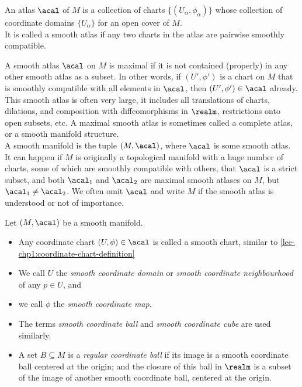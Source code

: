\documentclass[../main-v2-manifolds.tex]{subfiles}
\begin{document}
\begin{definition}\label{lee-chp1:smooth-atlas}
    An atlas $\acal$ of $M$ is a collection of charts $\{(U_\alpha, \phi_\alpha)\}$ whose collection of coordinate domains $\{U_\alpha\}$ for an open cover of $M$.\\ It is called a smooth atlas if any two charts in the atlas are pairwise smoothly compatible.
\end{definition}

\begin{definition}\label{lee-chp1:smooth-manifold}
    A smooth atlas $\acal$ on $M$ is maximal if it is not contained (properly) in any other smooth atlas as a subset. In other words, if $(U',\phi')$ is a chart on $M$ that is smoothly compatible with all elements in $\acal$, then $(U',\phi')\in\acal$ already.\\
    
    This smooth atlas is often very large, it includes all translations of charts, dilations, and composition with diffeomorphisms in $\realm$, restrictions onto open subsets, etc. A maximal smooth atlas is sometimes called a complete atlas, or a smooth manifold structure.\\

    A smooth manifold is the tuple $(M,\acal)$, where $\acal$ is some smooth atlas. It can happen if $M$ is originally a topological manifold with a huge number of charts, some of which are smoothly compatible with others, that $\acal$ is a strict subset, and both $\acal_1$ and $\acal_2$ are maximal smooth atlases on $M$, but $\acal_1\neq\acal_2$. We often omit $\acal$ and write $M$ if the smooth atlas is understood or not of importance.
\end{definition}

\begin{definition}\label{lee-chp1:smooth-coordinate-definitions}
    Let $(M,\acal)$ be a smooth manifold. 
    \begin{itemize}
        \item Any coordinate chart $(U,\phi)\in\acal$ is called a smooth chart, similar to \cref{lee-chp1:coordinate-chart-definition}
        \item We call $U$ the \emph{smooth coordinate domain} or \emph{smooth coordinate neighbourhood} of any $p\in U$, and
        \item we call $\phi$ the \emph{smooth coordinate map}.
        \item The terms \emph{smooth coordinate ball} and \emph{smooth coordinate cube} are used similarly.
        \item A set $B\subseteq M$ is a \emph{regular coordinate ball} if its image is a smooth coordinate ball centered at the origin; and the closure of this ball in $\realm$ is a subset of the image of another smooth coordinate ball, centered at the origin.
    \end{itemize}
\end{definition}
\end{document}

